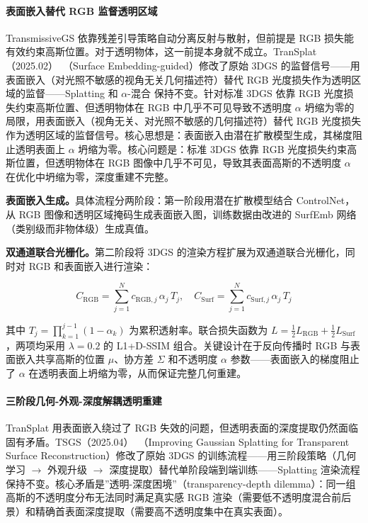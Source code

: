 \paragraph{表面嵌入替代 RGB 监督透明区域}

TransmissiveGS 依靠残差引导策略自动分离反射与散射，但前提是 RGB 损失能有效约束高斯位置。对于透明物体，这一前提本身就不成立。TranSplat（2025.02）~\cite{2502_07840}（Surface Embedding-guided）修改了原始 3DGS 的监督信号——用表面嵌入（对光照不敏感的视角无关几何描述符）替代 RGB 光度损失作为透明区域的监督——Splatting 和 $\alpha$-混合 保持不变。针对标准 3DGS 依靠 RGB 光度损失约束高斯位置、但透明物体在 RGB 中几乎不可见导致不透明度 $\alpha$ 坍缩为零的局限，用表面嵌入（视角无关、对光照不敏感的几何描述符）替代 RGB 光度损失作为透明区域的监督信号。核心思想是：表面嵌入由潜在扩散模型生成，其梯度阻止透明表面上 $\alpha$ 坍缩为零。核心问题是：标准 3DGS 依靠 RGB 光度损失约束高斯位置，但透明物体在 RGB 图像中几乎不可见，导致其表面高斯的不透明度 $\alpha$ 在优化中坍缩为零，深度重建不完整。

\textbf{表面嵌入生成。}具体流程分两阶段：第一阶段用潜在扩散模型结合 ControlNet，从 RGB 图像和透明区域掩码生成表面嵌入图，训练数据由改进的 SurfEmb 网络（类别级而非物体级）生成真值。

\textbf{双通道联合光栅化。}第二阶段将 3DGS 的渲染方程扩展为双通道联合光栅化，同时对 RGB 和表面嵌入进行渲染：

\begin{equation}
C_{\text{RGB}} = \sum_{j=1}^{N} c_{\text{RGB},j}\,\alpha_j\,T_j, \quad C_{\text{Surf}} = \sum_{j=1}^{N} c_{\text{Surf},j}\,\alpha_j\,T_j
\end{equation}

其中 $T_j = \prod_{k=1}^{j-1}(1-\alpha_k)$ 为累积透射率。联合损失函数为 $L = \frac{1}{2}L_{\text{RGB}} + \frac{1}{2}L_{\text{Surf}}$，两项均采用 $\lambda=0.2$ 的 L1+D-SSIM 组合。关键设计在于反向传播时 RGB 与表面嵌入共享高斯的位置 $\mu$、协方差 $\Sigma$ 和不透明度 $\alpha$ 参数——表面嵌入的梯度阻止了 $\alpha$ 在透明表面上坍缩为零，从而保证完整几何重建。

\paragraph{三阶段几何-外观-深度解耦透明重建}

TranSplat 用表面嵌入绕过了 RGB 失效的问题，但透明表面的深度提取仍然面临固有矛盾。TSGS（2025.04）~\cite{2504_12799}（Improving Gaussian Splatting for Transparent Surface Reconstruction）修改了原始 3DGS 的训练流程——用三阶段策略（几何学习 $\to$ 外观升级 $\to$ 深度提取）替代单阶段端到端训练——Splatting 渲染流程保持不变。核心矛盾是”透明-深度困境”（transparency-depth dilemma）：同一组高斯的不透明度分布无法同时满足真实感 RGB 渲染（需要低不透明度混合前后景）和精确首表面深度提取（需要高不透明度集中在真实表面）。

